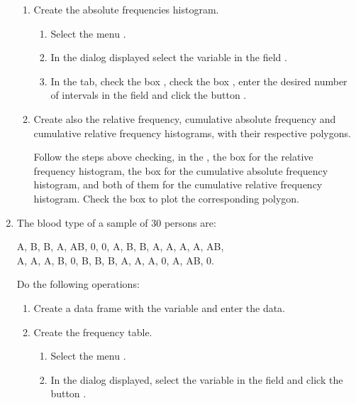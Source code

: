 \begin{enumerate}[leftmargin=*]
\begin{enumerate}
\item Create the absolute frequencies histogram.
\begin{indication}
\begin{enumerate}
\item Select the menu .
\item In the dialog displayed select the variable  in the field .
\item In the  tab, check the box , check the box
, enter the desired number of intervals in the field  and click
the button .
\end{enumerate}
\end{indication}

\item Create also the relative frequency, cumulative absolute frequency and cumulative relative frequency
histograms, with their respective polygons.
\begin{indication}Follow the steps above checking, in the ,
the box  for the relative frequency histogram, the box  for
the cumulative absolute frequency histogram, and both of them for the cumulative relative frequency histogram.
Check the box  to plot the corresponding polygon. 
\end{indication}
\end{enumerate}

\item The blood type of a sample of 30 persons are:
\begin{center}
A, B, B, A, AB, 0, 0, A, B, B, A, A, A, A, AB,\\
A, A, A, B, 0, B, B, B, A, A, A, 0, A, AB, 0. 
\end{center}
Do the following operations:
\begin{enumerate}
\item Create a data frame with the variable  and enter the data.

\item Create the frequency table.
\begin{indication}
\begin{enumerate}
\item Select the menu .
\item In the dialog displayed, select the variable  in the field
 and click the button .
\end{enumerate}
\end{indication}


\end{enumerate}
\end{enumerate}
